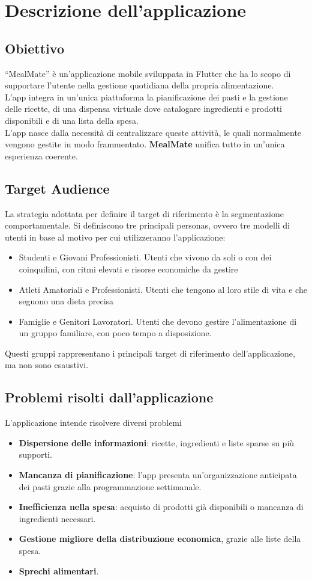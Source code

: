 \documentclass[a4paper, 12pt]{article}
\begin{document}
\newpage
\tableofcontents
\newpage
\section{Descrizione dell’applicazione}
\subsection{Obiettivo}
“MealMate” è un’applicazione mobile sviluppata in Flutter che ha lo scopo di supportare l’utente nella gestione quotidiana della propria alimentazione.\\
L’app integra in un’unica piattaforma la pianificazione dei pasti e la gestione delle ricette, di una dispensa virtuale dove catalogare ingredienti e prodotti disponibili e di una lista della spesa.\\
L’app nasce dalla necessità di centralizzare queste attività, le quali normalmente vengono gestite in modo frammentato. \textbf{MealMate} unifica tutto in un’unica esperienza coerente.

\subsection{Target Audience}
La strategia adottata per definire il target di riferimento è la segmentazione comportamentale. Si definiscono tre principali personas, 
ovvero tre modelli di utenti in base al motivo per cui utilizzeranno l’applicazione:
\begin{itemize}
    \item Studenti e Giovani Professionisti. Utenti che vivono da soli o con dei coinquilini, con ritmi elevati e risorse economiche da gestire
    \item Atleti Amatoriali e Professionisti. Utenti che tengono al loro stile di vita e che seguono una dieta precisa
    \item Famiglie e Genitori Lavoratori. Utenti che devono gestire l’alimentazione di un gruppo familiare, con poco tempo a disposizione.
\end{itemize}
Questi gruppi rappresentano i principali target di riferimento dell’applicazione, ma non sono esaustivi.

\subsection{Problemi risolti dall’applicazione}
L’applicazione intende risolvere diversi problemi
\begin{itemize}
    \item \textbf{Dispersione delle informazioni}: ricette, ingredienti e liste sparse su più supporti.
    \item \textbf{Mancanza di pianificazione}: l’app presenta un’organizzazione anticipata dei pasti grazie alla programmazione settimanale.
    \item \textbf{Inefficienza nella spesa}: acquisto di prodotti già disponibili o mancanza di ingredienti necessari.
    \item \textbf{Gestione migliore della distribuzione economica}, grazie alle liste della spesa.
    \item \textbf{Sprechi alimentari}.
\end{itemize}
\end{document}
